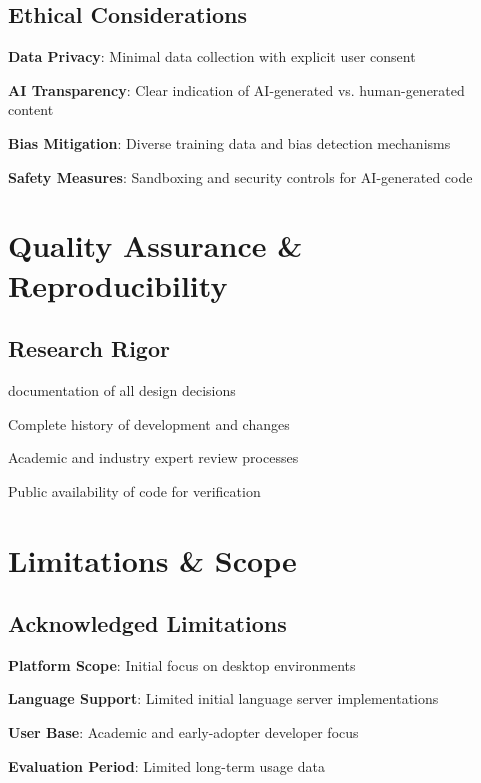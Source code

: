 \subsection*{Ethical Considerations}
\begin{compactlist}
    \item \textbf{Data Privacy}: Minimal data collection with explicit user consent
    \item \textbf{AI Transparency}: Clear indication of AI-generated vs. human-generated content
    \item \textbf{Bias Mitigation}: Diverse training data and bias detection mechanisms
    \item \textbf{Safety Measures}: Sandboxing and security controls for AI-generated code
\end{compactlist}

\section*{Quality Assurance \& Reproducibility}

\subsection*{Research Rigor}
\begin{description}[leftmargin=3cm,labelwidth=2.5cm]
    \item[\textbf{Documentation}]  documentation of all design decisions
    \item[\textbf{Version Control}] Complete history of development and changes
    \item[\textbf{Peer Review}] Academic and industry expert review processes
    \item[\textbf{Open Source}] Public availability of code for verification
\end{description}

\section*{Limitations \& Scope}

\subsection*{Acknowledged Limitations}
\begin{compactlist}
    \item \textbf{Platform Scope}: Initial focus on desktop environments
    \item \textbf{Language Support}: Limited initial language server implementations
    \item \textbf{User Base}: Academic and early-adopter developer focus
    \item \textbf{Evaluation Period}: Limited long-term usage data
\end{compactlist}

